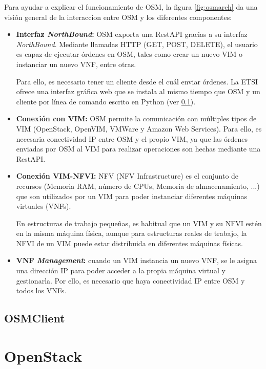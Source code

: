 Para ayudar a explicar el funcionamiento de OSM, la figura \ref{fig:osmarch} da una visión general de la interaccion entre OSM y los diferentes componentes:

\begin{itemize}
	\item \textbf{Interfaz \textit{NorthBound}:} OSM exporta una RestAPI gracias a su interfaz \textit{NorthBound}. Mediante llamadas HTTP (GET, POST, DELETE), el usuario es capaz de ejecutar órdenes en OSM, tales como crear un nuevo VIM o instanciar un nuevo VNF, entre otras.
	
	Para ello, es necesario tener un cliente desde el cuál enviar órdenes. La ETSI ofrece una interfaz gráfica web que se instala al mismo tiempo que OSM y un cliente por línea de comando escrito en Python (ver \ref{subsec:osmclientpython}).
	
	\item \textbf{Conexión con VIM:} OSM permite la comunicación con múltiples tipos de VIM (OpenStack, OpenVIM, VMWare y Amazon Web Services). Para ello, es necesaria conectividad IP entre OSM y el propio VIM, ya que las órdenes enviadas por OSM al VIM para realizar operaciones son hechas mediante una RestAPI.
	
	\item \textbf{Conexión VIM-NFVI:} NFV (NFV Infrastructure) es el conjunto de recursos (Memoria RAM, número de CPUs, Memoria de almacenamiento, ...) que son utilizados por un VIM para poder instanciar diferentes máquinas virtuales (VNFs). 
	
	En estructuras de trabajo pequeñas, es habitual que un VIM y su NFVI estén en la misma máquina física, aunque para estructuras reales de trabajo, la NFVI de un VIM puede estar distribuida en diferentes máquinas físicas.
	
	\item \textbf{VNF \textit{Management}:} cuando un VIM instancia un nuevo VNF, se le asigna una dirección IP para poder acceder a la propia máquina virtual y gestionarla. Por ello, es necesario que haya conectividad IP entre OSM y todos los VNFs. 
\end{itemize}

\subsection{OSMClient}
\label{subsec:osmclientpython}

\section{OpenStack}
\label{sec:openstack}

